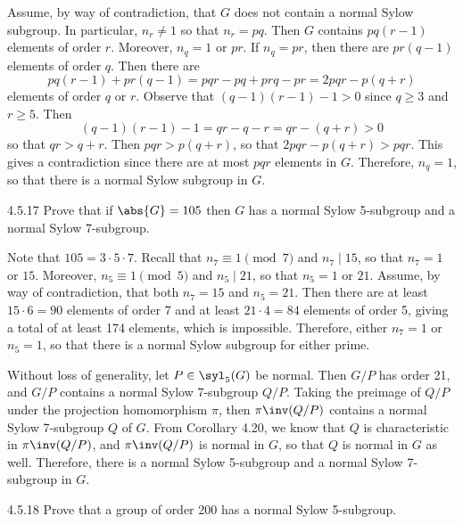 \begin{sol}
	Assume, by way of contradiction, that $G$ does not contain a normal Sylow subgroup.
	In particular, $n_r \neq 1$ so that $n_r = pq$.
	Then $G$ contains $pq(r - 1)$ elements of order $r$.
	Moreover, $n_q = 1$ or $pr$.
	If $n_q = pr$, then there are $pr(q - 1)$ elements of order $q$.
	Then there are 
	\[
		pq(r - 1) + pr(q - 1) = pqr - pq + prq - pr = 2pqr - p(q + r)
	\]
	elements of order $q$ or $r$.
	Observe that $(q - 1)(r - 1) - 1 > 0$ since $q \geq 3$ and $r \geq 5$.
	Then
	\[
		(q - 1)(r - 1) - 1 = qr - q - r = qr - (q + r) > 0
	\]
	so that $qr > q + r$.
	Then $pqr > p(q + r)$, so that $2pqr - p(q + r) > pqr$.
	This gives a contradiction since there are at most $pqr$ elements in $G$.
	Therefore, $n_q = 1$, so that there is a normal Sylow subgroup in $G$.
\end{sol}

\begin{exercise}{4.5.17}
	Prove that if $\abs{G} = 105$ then $G$ has a normal Sylow 5-subgroup and a normal Sylow 7-subgroup.
\end{exercise}

\begin{sol}
	Note that $105 = 3 \cdot 5 \cdot 7$.
	Recall that $n_7 \equiv 1 \pmod 7$ and $n_7 \mid 15$, so that $n_7 = 1$ or $15$.
	Moreover, $n_5 \equiv 1 \pmod 5$ and $n_5 \mid 21$, so that $n_5 = 1$ or $21$.
	Assume, by way of contradiction, that both $n_7 = 15$ and $n_5 = 21$.
	Then there are at least $15 \cdot 6 = 90$ elements of order 7 and at least $21 \cdot 4 = 84$ elements of order 5, giving a total of at least 174 elements, which is impossible.
	Therefore, either $n_7 = 1$ or $n_5 = 1$, so that there is a normal Sylow subgroup for either prime.

	Without loss of generality, let $P \in \syl_5(G)$ be normal.
	Then $G/P$ has order 21, and $G/P$ contains a normal Sylow 7-subgroup $Q/P$.
	Taking the preimage of $Q/P$ under the projection homomorphism $\pi$, then $\pi\inv(Q/P)$ contains a normal Sylow 7-subgroup $Q$ of $G$.
	From Corollary 4.20, we know that $Q$ is characteristic in $\pi\inv(Q/P)$, and $\pi\inv(Q/P)$ is normal in $G$, so that $Q$ is normal in $G$ as well.
	Therefore, there is a normal Sylow 5-subgroup and a normal Sylow 7-subgroup in $G$.
\end{sol}

\begin{exercise}{4.5.18}
	Prove that a group of order 200 has a normal Sylow 5-subgroup.
\end{exercise}

